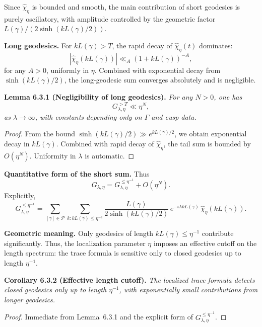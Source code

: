 \noindent
Since $\widehat{\chi}_\eta$ is bounded and smooth,  
the main contribution of short geodesics is purely oscillatory,  
with amplitude controlled by the geometric factor $L(\gamma)/(2\sinh(kL(\gamma)/2))$.

\medskip

\noindent\textbf{Long geodesics.}
For $kL(\gamma)>T$,  
the rapid decay of $\widehat{\chi}_\eta(t)$ dominates:
\[
  |\widehat{\chi}_\eta(kL(\gamma))| \ll_A (1+kL(\gamma))^{-A},
\]
for any $A>0$, uniformly in $\eta$.  
Combined with exponential decay from $\sinh(kL(\gamma)/2)$,  
the long-geodesic sum converges absolutely and is negligible.

\medskip

\noindent\textbf{Lemma 6.3.1 (Negligibility of long geodesics).}
\emph{For any $N>0$, one has}
\[
  G_{\lambda,\eta}^{>T} \ll \eta^N,
\]
\emph{as $\lambda\to\infty$, with constants depending only on $\Gamma$ and cusp data.}

\begin{proof}
From the bound $\sinh(kL(\gamma)/2)\gg e^{kL(\gamma)/2}$,  
we obtain exponential decay in $kL(\gamma)$.  
Combined with rapid decay of $\widehat{\chi}_\eta$, the tail sum is bounded by $O(\eta^N)$.  
Uniformity in $\lambda$ is automatic.
\end{proof}

\medskip

\noindent\textbf{Quantitative form of the short sum.}
Thus
\[
  G_{\lambda,\eta} = G_{\lambda,\eta}^{\leq \eta^{-1}} + O(\eta^N).
\]
Explicitly,
\[
  G_{\lambda,\eta}^{\leq \eta^{-1}}
  = \sum_{[\gamma]\in\mathcal{P}} \sum_{k: kL(\gamma)\leq \eta^{-1}}
  \frac{L(\gamma)}{2\sinh(kL(\gamma)/2)}\,
  e^{-i\lambda kL(\gamma)}\,
  \widehat{\chi}_\eta(kL(\gamma)).
\]

\medskip

\noindent\textbf{Geometric meaning.}
Only geodesics of length $kL(\gamma)\leq \eta^{-1}$ contribute significantly.  
Thus, the localization parameter $\eta$ imposes an effective cutoff on the length spectrum:  
the trace formula is sensitive only to closed geodesics up to length $\eta^{-1}$.

\medskip

\noindent\textbf{Corollary 6.3.2 (Effective length cutoff).}
\emph{The localized trace formula detects closed geodesics only up to length $\eta^{-1}$,  
with exponentially small contributions from longer geodesics.}

\begin{proof}
Immediate from Lemma~6.3.1 and the explicit form of $G_{\lambda,\eta}^{\leq \eta^{-1}}$.
\end{proof}

